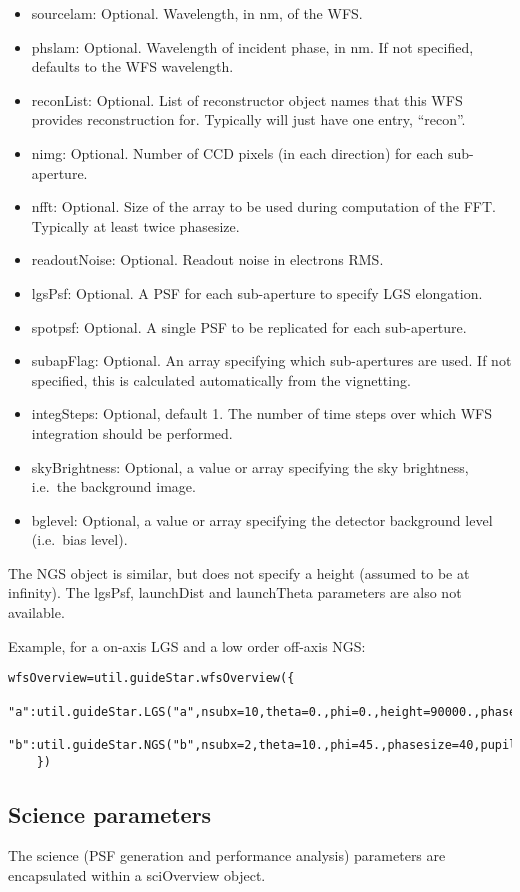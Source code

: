 \documentclass{article}
\begin{document}
\begin{itemize}
\item sourcelam: Optional.  Wavelength, in nm, of the WFS.
\item phslam: Optional.  Wavelength of incident phase, in nm.  If not specified,
  defaults to the WFS wavelength.  
\item reconList: Optional.  List of reconstructor object names that this WFS
  provides reconstruction for.  Typically will just have one entry,
  ``recon''.
\item nimg: Optional.  Number of CCD pixels (in each direction) for
  each sub-aperture.
\item nfft: Optional.  Size of the array to be used during computation
  of the FFT.  Typically at least twice phasesize.
\item readoutNoise: Optional.  Readout noise in electrons RMS.
\item lgsPsf: Optional.  A PSF for each sub-aperture to specify LGS
  elongation.
\item spotpsf: Optional.  A single PSF to be replicated for each
  sub-aperture.  
\item subapFlag: Optional.  An array specifying which sub-apertures
  are used.  If not specified, this is calculated automatically from
  the vignetting.
\item integSteps: Optional, default 1.  The number of time steps over
  which WFS integration should be performed.  
\item skyBrightness: Optional, a value or array specifying the sky
  brightness, i.e.\ the background image.
\item bglevel: Optional, a value or array specifying the detector
  background level (i.e.\ bias level).
\end{itemize}

The NGS object is similar, but does not specify a height (assumed to
be at infinity).  The lgsPsf, launchDist and launchTheta parameters
are also not available.  

Example, for a on-axis LGS and a low order off-axis NGS:
\begin{verbatim}
wfsOverview=util.guideStar.wfsOverview({
    "a":util.guideStar.LGS("a",nsubx=10,theta=0.,phi=0.,height=90000.,phasesize=8,pupil=pupil),
    "b":util.guideStar.NGS("b",nsubx=2,theta=10.,phi=45.,phasesize=40,pupil=pupil)
    })
\end{verbatim}

\subsection{Science parameters}
The science (PSF generation and performance analysis) parameters are
encapsulated within a sciOverview object.
\end{document}
